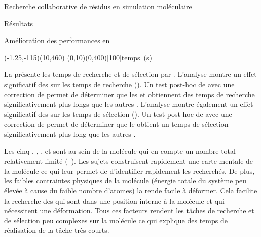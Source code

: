 \documentclass[myfrancais]{mythesis}
\begin{document}
\begin{mychapter}{Recherche collaborative de résidus en simulation moléculaire}
\begin{mysection}{Résultats}
\begin{mysubsection}{Amélioration des performances en }
				\begin{myfigure}
					\begin{myps}(-1.25,-115)(10,460)
						\myaxes(0,10){}(0,400)[100]{temps~(s)}
					\end{myps}
				\end{myfigure}

				La  présente les temps de recherche et de sélection par  .
				L'analyse montre un effet significatif des   sur les temps de recherche ().
				Un test post-hoc de  avec une correction de  permet de déterminer que les   et  obtiennent des temps de recherche significativement plus longs que les autres .
				L'analyse montre également un effet significatif des   sur les temps de sélection ().
				Un test post-hoc de  avec une correction de  permet de déterminer que le   obtient un temps de sélection significativement plus long que les autres .

				Les cinq  , , ,  et  sont au sein de la molécule \myTRPCAGE qui en compte un nombre total relativement limité (~).
				Les sujets construisent rapidement une carte mentale de la molécule ce qui leur permet de d'identifier rapidement les  recherchés.
				De plus, les faibles contraintes physiques de la molécule (énergie totale du système peu élevée à cause du faible nombre d'atomes) la rende facile à déformer.
				Cela facilite la recherche des  qui sont dans une position interne à la molécule et qui nécessitent une déformation.
				Tous ces facteurs rendent les tâches de recherche et de sélection peu complexes sur la molécule \myTRPCAGE ce qui explique des temps de réalisation de la tâche très courts.


\end{mysubsection}
\end{mysection}
\end{mychapter}
\end{document}
